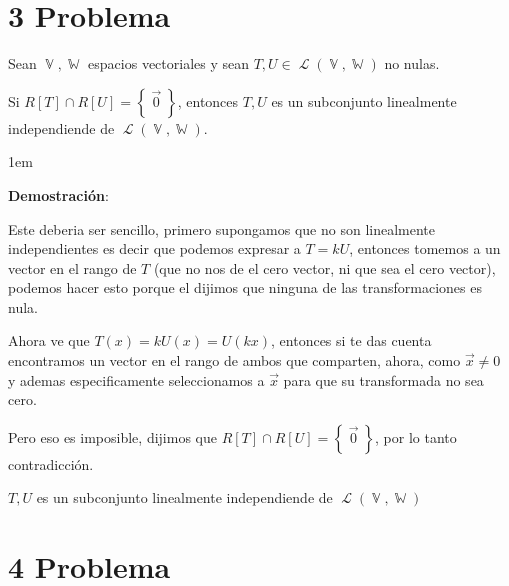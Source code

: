 \documentclass[12pt, fleqn]{article}                             %
\newenvironment{SmallIndentation}[1][0.75em]                    %
        {\begin{adjustwidth}{#1}{}\begin{footnotesize}}             %
        {\end{footnotesize}\end{adjustwidth}}                       %
\theoremstyle{break}                                            %
\DeclareMathOperator \VectorSet    {\mathbb{V}}                 %
\DeclareMathOperator \SubVectorSet {\mathbb{W}}                 %
\DeclareMathOperator \LinTrans {\mathcal{T}}                    %
\DeclareMathOperator \Laplace {\mathcal{L}}                     %
\newcommand{\Set}[1]    {\left\{ \; #1 \; \right\}}             %
\begin{document}
     


\clearpage
\section{3 Problema}


    Sean $\VectorSet, \SubVectorSet$ espacios vectoriales y sean 
    $T, U \in \Laplace(\VectorSet, \SubVectorSet)$ no nulas. 

    Si $R[T] \cap R[U] = \Set{\vec 0}$, entonces ${T, U}$ es un
    subconjunto linealmente independiende de $\Laplace(\VectorSet, \SubVectorSet)$. 

    \begin{SmallIndentation}[1em]
        \textbf{Demostración}:
        
        Este deberia ser sencillo, primero supongamos que no son linealmente independientes
        es decir que podemos expresar a $T = kU$, entonces tomemos a un vector en el rango 
        de $T$ (que no nos de el cero vector, ni que sea el cero vector), podemos hacer esto
        porque el dijimos que ninguna de las transformaciones es nula.

        Ahora ve que $T(x) = kU(x) = U(kx)$, entonces si te das cuenta encontramos un vector
        en el rango de ambos que comparten, ahora, como $\vec x \neq 0$ y ademas especificamente
        seleccionamos a $\vec x$ para que su transformada no sea cero.

        Pero eso es imposible, dijimos que $R[T] \cap R[U] = \Set{\vec 0}$, por lo tanto
        contradicción.

        ${T, U}$ es un subconjunto linealmente independiende de $\Laplace(\VectorSet, \SubVectorSet)$

    \end{SmallIndentation}
                            


\vspace{1em}
\section{4 Problema}
\end{document}
